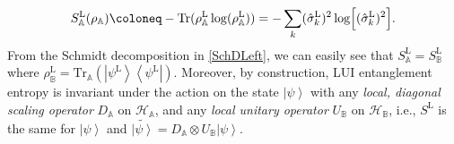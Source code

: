 \documentclass[11pt,a4paper]{article}
\newcommand{\Tr}{\text{Tr}}
\newcommand{\ket}[1]{\left|#1\right\rangle}
\newcommand{\bra}[1]{\left\langle#1\right|}
\begin{document}
\begin{equation}
 S^{\mathrm{L}}_\mathbb{A}(\rho_\mathbb{A})\coloneq -\Tr(\rho^{\mathrm L}_\mathbb{A}\log(\rho^{\mathrm L}_\mathbb{A}))= -\sum_{k} (\hat{\sigma}_k^\mathrm{L})^2 \log\Bigl[(\hat{\sigma}_k^\mathrm{L})^2\Bigr].
 \label{eq:entropy-left}
\end{equation}
From the Schmidt decomposition in \cref{SchDLeft}, we can easily see that $S^{\mathrm{L}}_\mathbb{A}=S^{\mathrm{L}}_\mathbb{B}$ where $\rho^\mathrm{L}_\mathbb{B}=\Tr_{\mathbb{A}}(\ket{\psi^\mathrm{L}}\bra{\psi^\mathrm{L}})$. Moreover, by construction, LUI entanglement entropy is invariant under the action on the state $\ket{\psi}$ with any \textit{local, diagonal scaling operator} \(D_\mathbb{A}\) on $\mathcal{H}_\mathbb{A}$, and any \textit{local unitary operator} \(U_\mathbb{B} \) on $\mathcal{H}_\mathbb{B}$, i.e., $S^\mathrm{L}$ is the same for $\ket{\psi}$ and $\tilde{\ket{\psi}}=D_\mathbb{A} \otimes U_\mathbb{B} \ket{\psi}$.
\end{document}
